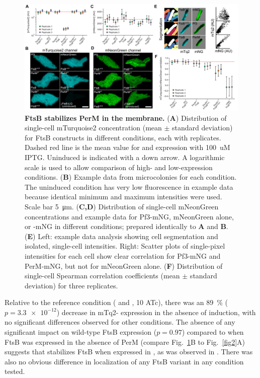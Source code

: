 \documentclass[pdflatex,sn-basic]{sn-jnl}%
\begin{document}
\begin{figure}[h]
\centering
\includegraphics[width=1.0\textwidth]{../figures/fig3.png}
\caption{\textbf{FtsB stabilizes PerM in the \ec{} membrane.} (\textbf{A}) Distribution of single-cell mTurquoise2 concentration (mean $\pm$ standard deviation) for FtsB constructs in different conditions, each with replicates. Dashed red line is the mean value for \permN{} and \ftsbdLQ{} expression with \qty{100}{uM} IPTG. Uninduced \ftsbdLQ{} is indicated with a down arrow. A logarithmic scale is used to allow comparison of high- and low-expression conditions. (\textbf{B}) Example data from microcolonies for each condition. The uninduced \ftsbdLQ{} condition has very low fluorescence in example data because identical minimum and maximum intensities were used. Scale bar \qty{5}{\um}. (\textbf{C,D}) Distribution of single-cell mNeonGreen concentrations and example data for Pf3-mNG, mNeonGreen alone, or \permN{}-mNG in different conditions; prepared identically to \textbf{A} and \textbf{B}. (\textbf{E}) Left: example data analysis showing cell segmentation and isolated, single-cell intensities. Right: Scatter plots of single-pixel intensities for each cell show clear correlation for Pf3-mNG and PerM-mNG, but not for mNeonGreen alone. (\textbf{F}) Distribution of single-cell Spearman correlation coefficients (mean $\pm$ standard deviation) for three replicates.}\label{fig3}
\end{figure}

Relative to the reference condition (\permN{} and \ftsbdLQ{}, \qty{10}{\nM} ATc), there was an \qty{89}{\percent} ($p=\num{3.3e-12}$) decrease in mTq2-\ftsbdLQ{} expression in the absence of induction, with no significant differences observed for other conditions. The absence of any significant impact on wild-type FtsB expression ($p=0.97$) compared to when FtsB was expressed in the absence of PerM (compare Fig.~\ref{fig3}B to Fig.~\ref{fig2}A) suggests that \permN{} stabilizes FtsB when expressed in \ec{}, as was observed in \mtb{} \citep{wangPersistentMycobacteriumTuberculosis2019}. There was also no obvious difference in localization of any FtsB variant in any condition tested.
\end{document}
